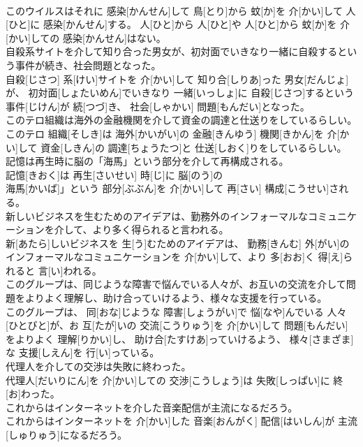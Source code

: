 \documentclass[8pt]{extreport}
\begin{document}
\begin{CJK}{UTF8}{min}
\\	このウイルスはそれに 感染[かんせん]して 鳥[とり]から 蚊[か]を 介[かい]して 人[ひと]に 感染[かんせん]する。 人[ひと]から 人[ひと]や 人[ひと]から 蚊[か]を 介[かい]しての 感染[かんせん]はない。
\\	自殺系サイトを介して知り合った男女が、初対面でいきなり一緒に自殺するという事件が続き、社会問題となった。	
\\	自殺[じさつ] 系[けい]サイトを 介[かい]して 知り合[しりあ]った 男女[だんじょ]が、 初対面[しょたいめん]でいきなり 一緒[いっしょ]に 自殺[じさつ]するという 事件[じけん]が 続[つづ]き、 社会[しゃかい] 問題[もんだい]となった。
\\	このテロ組織は海外の金融機関を介して資金の調達と仕送りをしているらしい。	
\\	このテロ 組織[そしき]は 海外[かいがい]の 金融[きんゆう] 機関[きかん]を 介[かい]して 資金[しきん]の 調達[ちょうたつ]と 仕送[しおく]りをしているらしい。
\\	記憶は再生時に脳の「海馬」という部分を介して再構成される。	
\\	記憶[きおく]は 再生[さいせい] 時[じ]に 脳[のう]の
\\	海馬[かいば]」という 部分[ぶぶん]を 介[かい]して 再[さい] 構成[こうせい]される。
\\	新しいビジネスを生むためのアイデアは、勤務外のインフォーマルなコミュニケーションを介して、より多く得られると言われる。	
\\	新[あたら]しいビジネスを 生[う]むためのアイデアは、 勤務[きんむ] 外[がい]のインフォーマルなコミュニケーションを 介[かい]して、より 多[おお]く 得[え]られると 言[い]われる。
\\	このグループは、同じような障害で悩んでいる人々が、お互いの交流を介して問題をよりよく理解し、助け合っていけるよう、様々な支援を行っている。	
\\	このグループは、 同[おな]じような 障害[しょうがい]で 悩[なや]んでいる 人々[ひとびと]が、お 互[たが]いの 交流[こうりゅう]を 介[かい]して 問題[もんだい]をよりよく 理解[りかい]し、 助け合[たすけあ]っていけるよう、 様々[さまざま]な 支援[しえん]を 行[い]っている。
\\	代理人を介しての交渉は失敗に終わった。	
\\	代理人[だいりにん]を 介[かい]しての 交渉[こうしょう]は 失敗[しっぱい]に 終[お]わった。
\\	これからはインターネットを介した音楽配信が主流になるだろう。	
\\	これからはインターネットを 介[かい]した 音楽[おんがく] 配信[はいしん]が 主流[しゅりゅう]になるだろう。

\end{CJK}
\end{document}
